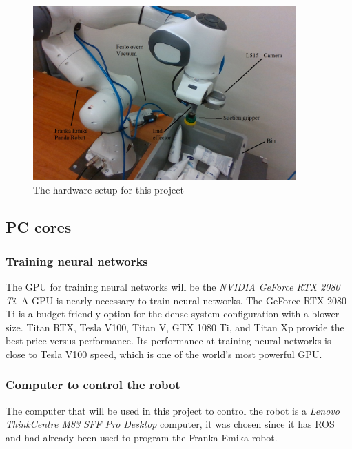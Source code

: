 \begin{figure}[h]
 \centering
 \includegraphics[width = 0.9\textwidth]{graphics/setup.jpg}
 \caption{The hardware setup for this project}
 \label{fig:setupproject}
\end{figure}
\linespread{0}
\subsection{PC cores}
\vspace{0.8cm}
\subsubsection*{Training neural networks}
The GPU for training neural networks will be the \textit{NVIDIA GeForce RTX 2080 Ti}\cite{noauthor_graphics_nodate}.
A GPU is nearly necessary to train neural networks. The GeForce RTX 2080 Ti is a budget-friendly option for the dense system configuration with a blower size. Titan RTX, Tesla V100, Titan V, GTX 1080 Ti, and Titan Xp provide the best price versus performance. Its performance at training neural networks is close to Tesla V100 speed, which is one of the world's most powerful GPU\cite{balaban_deep_2018}. 

\subsubsection*{Computer to control the robot}
The computer that will be used in this project to control the robot is a \textit{Lenovo ThinkCentre M83 SFF Pro Desktop}\cite{noauthor_thinkcentre_nodate} computer, it was chosen since it has ROS and had already been used to program the Franka Emika robot. 

\clearpage

